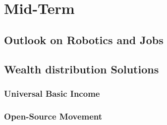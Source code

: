 \section{Mid-Term}
\label{sec:mid}

\subsection{Outlook on Robotics and Jobs}

\subsection{Wealth distribution Solutions}

\subsubsection{Universal Basic Income}

\subsubsection{Open-Source Movement}